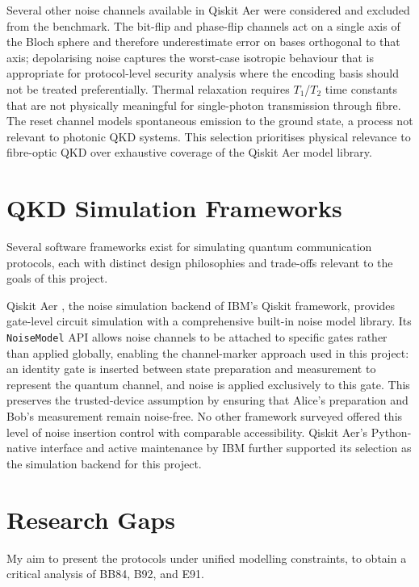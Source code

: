 \documentclass[10pt, a4paper]{report}
\begin{document}

Several other noise channels available in Qiskit Aer were considered and excluded from the benchmark. The bit-flip and phase-flip channels act on a single axis of the Bloch sphere and therefore underestimate error on bases orthogonal to that axis; depolarising noise captures the worst-case isotropic behaviour that is appropriate for protocol-level security analysis where the encoding basis should not be treated preferentially. Thermal relaxation requires $T_{1}$/$T_{2}$ time constants that are not physically meaningful for single-photon transmission through fibre. The reset channel models spontaneous emission to the ground state, a process not relevant to photonic QKD systems. This selection prioritises physical relevance to fibre-optic QKD over exhaustive coverage of the Qiskit Aer model library.


\section{QKD Simulation Frameworks}

Several software frameworks exist for simulating quantum communication protocols, each with distinct design philosophies and trade-offs relevant to the goals of this project.

Qiskit Aer \cite{QiskitAer}, the noise simulation backend of IBM's Qiskit framework, provides gate-level circuit simulation with a comprehensive built-in noise model library. Its \texttt{NoiseModel} API allows noise channels to be attached to specific gates rather than applied globally, enabling the channel-marker approach used in this project: an identity gate is inserted between state preparation and measurement to represent the quantum channel, and noise is applied exclusively to this gate. This preserves the trusted-device assumption by ensuring that Alice's preparation and Bob's measurement remain noise-free. No other framework surveyed offered this level of noise insertion control with comparable accessibility. Qiskit Aer's Python-native interface and active maintenance by IBM further supported its selection as the simulation backend for this project.

\section{Research Gaps}
My aim to present the protocols under unified modelling constraints, to obtain a critical analysis of BB84, B92, and E91.
\end{document}
